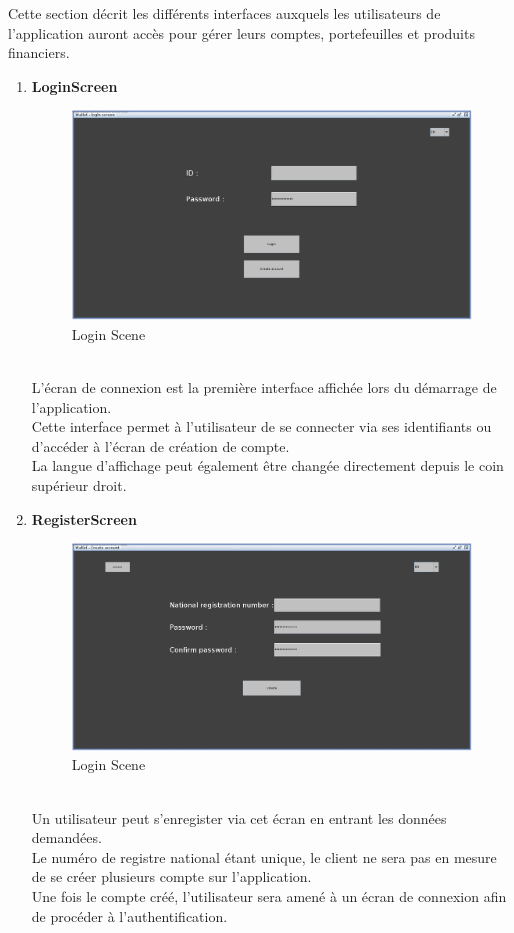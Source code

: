 \documentclass[../rapport.tex]{subfiles}
\begin{document}
Cette section décrit les différents interfaces auxquels les utilisateurs de l'application auront accès pour gérer leurs comptes, portefeuilles et produits financiers.\\

\begin{enumerate}
\item \textbf{LoginScreen} \\
		\begin{figure}[h!]
				\centering \includegraphics[scale=0.2]{ressources/photos_diagrammes/app1/gui/login.jpg}
				\caption{Login Scene}
		\end{figure}
		\\
L'écran de connexion est la première interface affichée lors du démarrage de l'application.\\
Cette interface permet à l'utilisateur de se connecter via ses identifiants ou d'accéder à l'écran de création de compte.\\
La langue d'affichage peut également être changée directement depuis le coin supérieur droit.

\item \textbf{RegisterScreen} \\
		\begin{figure}[h!]
				\centering \includegraphics[scale=0.2]{ressources/photos_diagrammes/app1/gui/createAccount.jpg}
				\caption{Login Scene}
		\end{figure}
		\\
Un utilisateur peut s'enregister via cet écran en entrant les données demandées.\\
Le numéro de registre national étant unique, le client ne sera pas en mesure de se créer plusieurs compte sur l'application.\\
Une fois le compte créé, l'utilisateur sera amené à un écran de connexion afin de procéder à l'authentification.


\end{enumerate}
\end{document}
